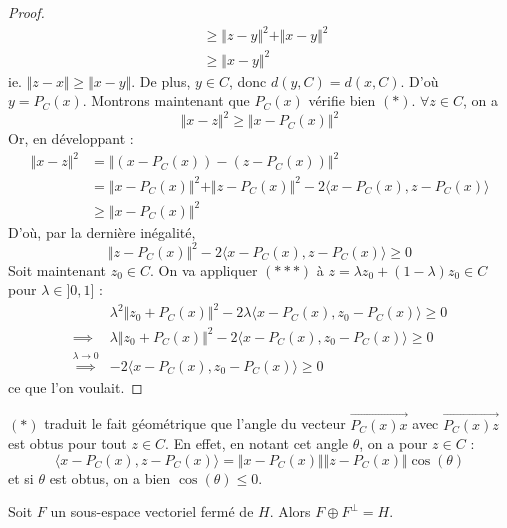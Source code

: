 \begin{proof}
\begin{align*}
      &\geq \Vert z - y \Vert^2 + \Vert x - y \Vert^2 \\
      &\geq \Vert x - y \Vert^2
    \end{align*}
    ie. $\Vert z - x \Vert \geq \Vert x - y \Vert$. De plus, $y \in C$, donc $d(y, C) = d(x, C)$. D'où $y = P_C(x)$.
    \newpar
    Montrons maintenant que $P_C(x)$ vérifie bien $(*)$. $\forall z \in C$, on a
    \[ \Vert x - z \Vert^2 \geq \Vert x - P_C(x) \Vert^2 \]
    Or, en développant :
    \begin{align*}
      \Vert x - z \Vert^2 &= \Vert (x - P_C(x)) - (z - P_C(x)) \Vert^2 \\
      &= \Vert x - P_C(x) \Vert^2 + \Vert z - P_C(x) \Vert^2 - 2 \langle x - P_C(x), z - P_C(x) \rangle \\
      &\geq \Vert x - P_C(x) \Vert^2
    \end{align*}
    D'où, par la dernière inégalité,
    \[ \Vert z - P_C(x) \Vert^2 - 2 \langle x - P_C(x), z - P_C(x) \rangle \geq 0 \tag{$***$} \]
    Soit maintenant $z_0 \in C$. On va appliquer $(***)$ à $z = \lambda z_0 + (1 - \lambda) z_0 \in C$ pour $\lambda \in ]0, 1]$ :
    \begin{align*}
      & \lambda^2 \Vert z_0 + P_C(x) \Vert^2 -2 \lambda \langle x - P_C(x), z_0 - P_C(x) \rangle \geq 0 \\
      \implies& \lambda \Vert z_0 + P_C(x) \Vert^2 -2 \langle x - P_C(x), z_0 - P_C(x) \rangle \geq 0 \\
      \overset{\lambda \longrightarrow 0}{\implies}& -2 \langle x - P_C(x), z_0 - P_C(x) \rangle \geq 0
    \end{align*}
    ce que l'on voulait.
  \end{proof}

  \begin{remark}
    $(*)$ traduit le fait géométrique que l'angle du vecteur $\overrightarrow{P_C(x)x}$ avec $\overrightarrow{P_C(x)z}$ est obtus pour tout $z \in C$. En effet, en notant cet angle $\theta$, on a pour $z \in C$ :
    \[ \langle x - P_C(x), z - P_C(x) \rangle = \Vert x - P_C(x) \Vert \Vert z - P_C(x) \Vert \cos (\theta) \]
    et si $\theta$ est obtus, on a bien $\cos (\theta) \leq 0$.
  \end{remark}

  \begin{corollary}
    Soit $F$ un sous-espace vectoriel fermé de $H$. Alors $F \oplus F^\perp = H$.
  \end{corollary}


